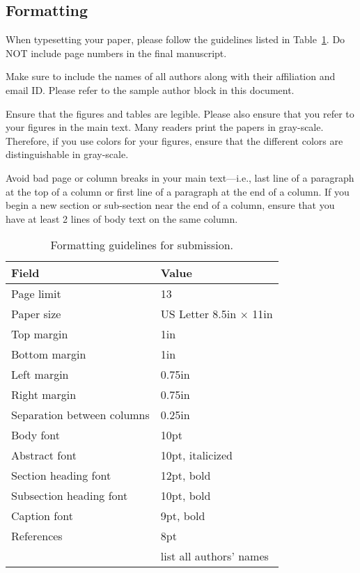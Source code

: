 \documentclass[final,nopageno]{jpaper}
\begin{document}
\subsection{Formatting}
When typesetting your paper, please follow the guidelines listed in
Table~\ref{table:formatting}.  Do NOT include page numbers in the final
manuscript.

Make sure to include the names of all
authors along with their affiliation and email ID. Please refer to
the sample author block in this document.

Ensure that the figures and tables are legible.  Please also ensure that you
refer to your figures in the main text. Many readers print the papers in
gray-scale. Therefore, if you use colors for your figures, ensure that the
different colors are distinguishable in gray-scale.

Avoid bad page or column breaks in your main text---i.e., last line of a
paragraph at the top of a column or first line of a paragraph at the end of a
column. If you begin a new section or sub-section near the end of a column,
ensure that you have at least 2 lines of body text on the same column.

 
\begin{table}[h!]
  \centering
  \begin{tabular}{|l|l|}
    \hline
    \textbf{Field} & \textbf{Value}\\
    \hline
    \hline
    Page limit & 13\\
    \hline
    Paper size & US Letter 8.5in $\times$ 11in\\
    \hline
    Top margin & 1in\\
    \hline
    Bottom margin & 1in\\
    \hline
    Left margin & 0.75in\\
    \hline
    Right margin & 0.75in\\
    \hline
    Separation between columns & 0.25in\\
    \hline
    Body font & 10pt\\
    \hline
    Abstract font & 10pt, italicized\\
    \hline
    Section heading font & 12pt, bold\\
    \hline
    Subsection heading font & 10pt, bold\\
    \hline
    Caption font & 9pt, bold\\
    \hline
    References & 8pt \\
               & list all authors' names\\
    \hline
  \end{tabular}
  \caption{Formatting guidelines for submission. }
  \label{table:formatting}
\end{table} 
 
\end{document}
